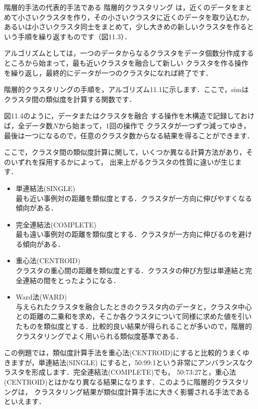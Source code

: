 
階層的手法の代表的手法である
階層的クラスタリング
は，近くのデータをまとめて小さいクラスタを作り，その小さいクラスタに近くのデータを取り込むか，あるいは小さいクラスタ同士をまとめて，少し大きめの新しいクラスタを作るという手順を繰り返すものです（図11.3）．

アルゴリズムとしては，一つのデータからなるクラスタをデータ個数分作成するところから始まって，最も近いクラスタを融合して新しい
クラスタを作る操作を繰り返し，最終的にデータが一つのクラスタになれば終了です．


階層的クラスタリングの手順を，アルゴリズム11.1に示します．ここで，simはクラスタ間の類似度を計算する関数です．


図11.4のように，データまたはクラスタを融合
する操作を木構造で記録しておけば，全データ数$N$から始まって，1回の操作で
クラスタが一つずつ減ってゆき，最後は一つになるので，任意のクラスタ数からなる結果を得ることができます．


ここで，クラスタ間の類似度計算に関して，いくつか異なる計算方法があり，そのいずれを採用するかによって，
出来上がるクラスタの性質に違いが生じます．

\begin{itemize}
\item 単連結法(SINGLE)\\
最も近い事例対の距離を類似度とする．クラスタが一方向に伸びやすくなる傾向がある．
\item 完全連結法(COMPLETE)\\
最も遠い事例対の距離を類似度とする．クラスタが一方向に伸びるのを避ける傾向がある．
\item 重心法(CENTROID)\\
クラスタの重心間の距離を類似度とする．クラスタの伸び方型は単連結と完全連結の間をとったようになる．
\item Ward法(WARD)\\
与えられたクラスタを融合したときのクラスタ内のデータと，クラスタ中心との距離の二乗和を求め，そこか各クラスタについて同様に求めた値を引いたものを類似度とする．比較的良い結果が得られることが多いので，階層的クラスタリングでよく用いられる類似度基準である．
\end{itemize}


この例題では，類似度計算手法を重心法(CENTROID)にすると比較的うまくゆきますが，単連結法(SINGLE)
にすると，50:99:1という非常にアンバランスなクラスタを形成します．完全連結法(COMPLETE)でも，
50:73:27と，重心法(CENTROID)とはかなり異なる結果になります．このように階層的クラスタリングは，
クラスタリング結果が類似度計算手法に大きく影響される手法であるといえます．

